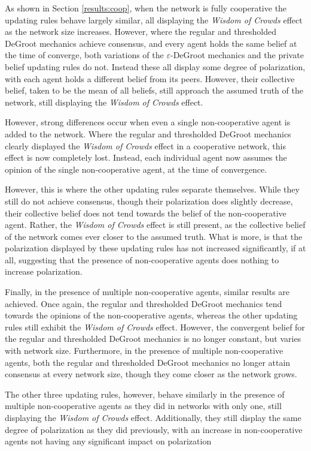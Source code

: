 \documentclass[a4paper, 12pt]{report}
\begin{document}
\noindent As shown in Section \ref{results:coop}, when the network is fully cooperative the updating rules behave largely similar, all displaying the \emph{Wisdom of Crowds} effect as the network size increases. However, where the regular and thresholded DeGroot mechanics achieve consensus, and every agent holds the same belief at the time of converge, both variations of the $\varepsilon$-DeGroot mechanics and the private belief updating rules do not. Instead these all display some degree of polarization, with each agent holds a different belief from its peers. However, their collective belief, taken to be the mean of all beliefs, still approach the assumed truth of the network, still displaying the \emph{Wisdom of Crowds} effect.

\noindent However, strong differences occur when even a single non-cooperative agent is added to the network. Where the regular and thresholded DeGroot mechanics clearly displayed the \emph{Wisdom of Crowds} effect in a cooperative network, this effect is now completely lost. Instead, each individual agent now assumes the opinion of the single non-cooperative agent, at the time of convergence. 

\noindent However, this is where the other updating rules separate themselves. While they still do not achieve consensus, though their polarization does slightly decrease, their collective belief does not tend towards the belief of the non-cooperative agent. Rather, the \emph{Wisdom of Crowds} effect is still present, as the collective belief of the network comes ever closer to the assumed truth. What is more, is that the polarization displayed by these updating rules has not increased significantly, if at all, suggesting that the presence of non-cooperative agents does nothing to increase polarization.

\noindent Finally, in the presence of multiple non-cooperative agents, similar results are achieved. Once again, the regular and thresholded DeGroot mechanics tend towards the opinions of the non-cooperative agents, whereas the other updating rules still exhibit the \emph{Wisdom of Crowds} effect. However, the convergent belief for the regular and thresholded DeGroot mechanics is no longer constant, but varies with network size. Furthermore, in the presence of multiple non-cooperative agents, both the regular and thresholded DeGroot mechanics no longer attain consensus at every network size, though they come closer as the network grows. 

\noindent The other three updating rules, however, behave similarly in the presence of multiple non-cooperative agents as they did in networks with only one, still displaying the \emph{Wisdom of Crowds} effect. Additionally, they still display the same degree of polarization as they did previously, with an increase in non-cooperative agents not having any significant impact on polarization
\end{document}

